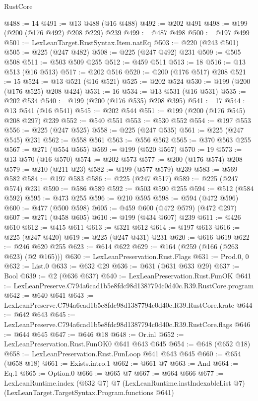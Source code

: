 \begin{lexlean}{RustCore}
\begin{coremodule}
@488 := 14
@491 := @13 @488 (@16 @488)
@492 := @202 @491
@498 := @199 (@200 (@176 @492) @208 @229) @239
@499 := @487 @498
@500 := @197 @499
@501 := LexLeanTarget.RustSyntax.Item.natEq
@503 := @220 (@243 @501)
@505 := @225 (@247 @482)
@508 := @225 (@247 @492) @231
@509 := @505 @508
@511 := @503 @509 @255
@512 := @459 @511
@513 := 18
@516 := @13 @513 (@16 @513)
@517 := @202 @516
@520 := @200 (@176 @517) @208
@521 := 15
@524 := @13 @521 (@16 @521)
@525 := @202 @524
@530 := @199 (@200 (@176 @525) @208 @424)
@531 := 16
@534 := @13 @531 (@16 @531)
@535 := @202 @534
@540 := @199 (@200 (@176 @535) @208 @395)
@541 := 17
@544 := @13 @541 (@16 @541)
@545 := @202 @544
@551 := @199 (@200 (@176 @545) @208 @297) @239
@552 := @540 @551
@553 := @530 @552
@554 := @197 @553
@556 := @225 (@247 @525)
@558 := @225 (@247 @535)
@561 := @225 (@247 @545) @231
@562 := @558 @561
@563 := @556 @562
@565 := @370 @563 @255
@567 := @271 (@554 @565)
@569 := @199 (@520 @567)
@570 := 19
@573 := @13 @570 (@16 @570)
@574 := @202 @573
@577 := @200 (@176 @574) @208
@579 := @210 (@211 @23)
@582 := @199 (@577 @579) @239
@583 := @569 @582
@584 := @197 @583
@586 := @225 (@247 @517)
@589 := @225 (@247 @574) @231
@590 := @586 @589
@592 := @503 @590 @255
@594 := @512 (@584 @592)
@595 := @473 @255
@596 := @210 @595
@598 := @594 (@472 @596)
@600 := @477 (@500 @598)
@605 := @459 @600 (@472 @579) (@472 @297)
@607 := @271 (@458 @605)
@610 := @199 (@434 @607) @239
@611 := @426 @610
@612 := @415 @611
@613 := @321 @612
@614 := @197 @613
@616 := @225 (@247 @420)
@619 := @225 (@247 @431) @231
@620 := @616 @619
@622 := @246 @620 @255
@623 := @614 @622
@629 := @164 (@259 (@166 (@263 @623) (@2 @165)))
@630 := LexLeanPreservation.Rust.Flags
@631 := Prod.{0, 0}
@632 := List.{0}
@633 := @632 @29
@636 := @631 (@631 @633 @29)
@637 := Bool
@639 := @2 (@636 @637)
@640 := LexLeanPreservation.Rust.FunOK
@641 := LexLeanPreserve.C794a6cad1b5e8fdc98d1387794c0d40c.R39.RustCore.program
@642 := @640 @641
@643 := LexLeanPreserve.C794a6cad1b5e8fdc98d1387794c0d40c.R39.RustCore.krate
@644 := @642 @643
@645 := LexLeanPreserve.C794a6cad1b5e8fdc98d1387794c0d40c.R39.RustCore.flags
@646 := @644 @645
@647 := @646 @18
@648 := Or.inl
@652 := LexLeanPreservation.Rust.FunOK0 @641 @643 @645
@654 := @648 (@652 @18)
@658 := LexLeanPreservation.Rust.FunLoop @641 @643 @645
@660 := @654 (@658 @18)
@661 := Exists.intro.{1}
@662 := @661 @7
@663 := And
@664 := Eq.{1}
@665 := Option.{0}
@666 := @665 @7
@667 := @664 @666
@677 := LexLeanRuntime.index
    (@632 @7)
    @7
    (LexLeanRuntime.instIndexableList @7)
    (LexLeanTarget.TargetSyntax.Program.functions @641)

\end{coremodule}
\end{lexlean}
